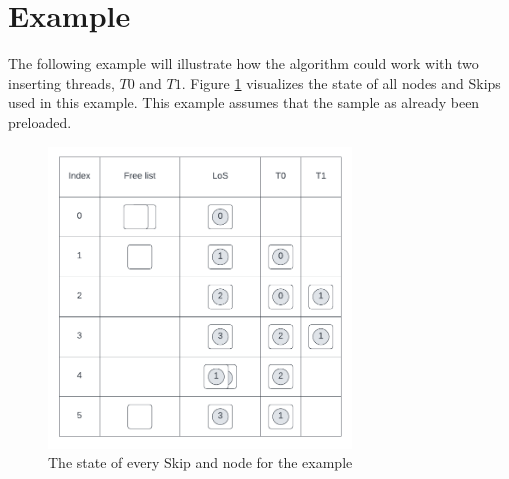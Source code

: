 \documentclass[sigconf,nonacm]{acmart}
\begin{document}
    \section{Example}
        The following example will illustrate how the algorithm could work with two inserting threads, $T0$ and $T1$. Figure \ref{fig:example} visualizes the state of all nodes and Skips used in this example. This example assumes that the sample as already been preloaded.
        \begin{figure}[h]
            \includegraphics[height=8cm]{figure6.pdf}
            \caption{The state of every Skip and node for the example}
            \label{fig:example}
        \end{figure}
\end{document}
